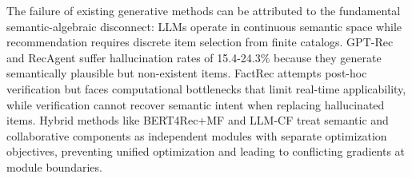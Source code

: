\documentclass[acmsmall]{acmart}
\begin{document}
\begin{table}[h]
\centering
\caption{Cross-dataset performance comparison}
\label{tab:rq1_results}
\end{table}

The failure of existing generative methods can be attributed to the fundamental semantic-algebraic disconnect: LLMs operate in continuous semantic space while recommendation requires discrete item selection from finite catalogs. GPT-Rec and RecAgent suffer hallucination rates of 15.4-24.3\% because they generate semantically plausible but non-existent items. FactRec attempts post-hoc verification but faces computational bottlenecks that limit real-time applicability, while verification cannot recover semantic intent when replacing hallucinated items. Hybrid methods like BERT4Rec+MF and LLM-CF treat semantic and collaborative components as independent modules with separate optimization objectives, preventing unified optimization and leading to conflicting gradients at module boundaries.
\end{document}
